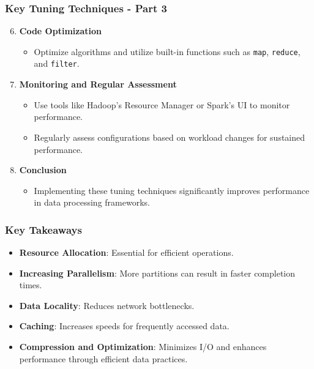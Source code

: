 \documentclass[aspectratio=169]{beamer}
\begin{document}
\begin{frame}[fragile]
    \frametitle{Key Tuning Techniques - Part 3}
    \begin{enumerate}
        \setcounter{enumi}{5} %
        \item \textbf{Code Optimization}
        \begin{itemize}
            \item Optimize algorithms and utilize built-in functions such as \texttt{map}, \texttt{reduce}, and \texttt{filter}.
        \end{itemize}

        \item \textbf{Monitoring and Regular Assessment}
        \begin{itemize}
            \item Use tools like Hadoop’s Resource Manager or Spark’s UI to monitor performance.
            \item Regularly assess configurations based on workload changes for sustained performance.
        \end{itemize}
        
        \item \textbf{Conclusion}
        \begin{itemize}
            \item Implementing these tuning techniques significantly improves performance in data processing frameworks.
        \end{itemize}
    \end{enumerate}
\end{frame}

\begin{frame}[fragile]
    \frametitle{Key Takeaways}
    \begin{itemize}
        \item \textbf{Resource Allocation}: Essential for efficient operations.
        \item \textbf{Increasing Parallelism}: More partitions can result in faster completion times.
        \item \textbf{Data Locality}: Reduces network bottlenecks.
        \item \textbf{Caching}: Increases speeds for frequently accessed data.
        \item \textbf{Compression and Optimization}: Minimizes I/O and enhances performance through efficient data practices.
    \end{itemize}
\end{frame}
\end{document}
